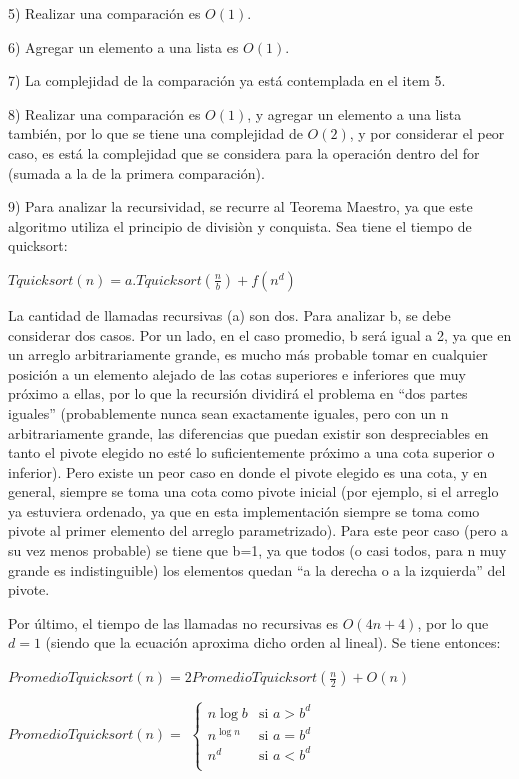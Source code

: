 \documentclass[article,a4paper]{article}
\begin{document}
5) Realizar una comparación es $O(1)$.

6) Agregar un elemento a una lista es $O(1)$.

7) La complejidad de la comparación ya está contemplada en el item 5.

8) Realizar una comparación es $O(1)$, y agregar un elemento a una lista también, por lo que se tiene una complejidad de $O(2)$, y por considerar el peor caso, es está la complejidad que se considera para la operación dentro del for (sumada a la de la primera comparación).

9) Para analizar la recursividad, se recurre al Teorema Maestro, ya que este algoritmo utiliza el principio de divisiòn y conquista. Sea tiene el tiempo de quicksort:

$Tquicksort(n) = a.Tquicksort(\frac{n}{b}) + f(n^d)$

La cantidad de llamadas recursivas (a) son dos. Para analizar b, se debe considerar dos casos. Por un lado, en el caso promedio, b será igual a 2, ya que en un arreglo arbitrariamente grande, es mucho más probable tomar en cualquier posición a un elemento alejado de las cotas superiores e inferiores que muy próximo a ellas, por lo que la recursión dividirá el problema en “dos partes iguales” (probablemente nunca sean exactamente iguales, pero con un n arbitrariamente grande, las diferencias que puedan existir son despreciables en tanto el pivote elegido no esté lo suficientemente próximo a una cota superior o inferior). Pero existe un peor caso en donde el pivote elegido es una cota, y en general, siempre se toma una cota como pivote inicial (por ejemplo, si el arreglo ya estuviera ordenado, ya que en esta implementación siempre se toma como pivote al primer elemento del arreglo parametrizado). Para este peor caso (pero a su vez menos probable) se tiene que b=1, ya que todos (o casi todos, para n muy grande es indistinguible) los elementos quedan “a la derecha o a la izquierda” del pivote. 

Por último, el tiempo de las llamadas no recursivas es $O(4n + 4)$, por lo que $d=1$ (siendo que la ecuación aproxima dicho orden al lineal). Se tiene entonces:

$PromedioTquicksort(n) = 2PromedioTquicksort(\frac{n}{2}) + O(n)$


$PromedioTquicksort(n) = $ $\begin{cases}
  n \log b  & \text{si }a > b^d\\    
  n^{\log n} & \text{si }a = b^d\\    
  n^d & \text{si }a < b^d\\    
\end{cases}$
\end{document}
